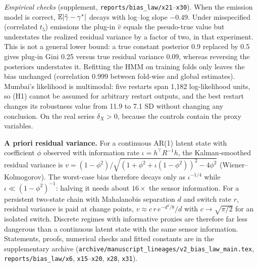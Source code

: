 \emph{Empirical checks} (supplement, \texttt{reports/bias\_law/x21}--\texttt{x30}). When the emission model is correct, $\mathbb{E}|\hat\gamma-\gamma^*|$ decays with log--log slope $-0.49$. Under misspecified (correlated $t_5$) emissions the plug-in $\hat v$ equals the pseudo-true value but understates the realized residual variance by a factor of two, in that experiment. This is not a general lower bound: a true constant posterior 0.9 replaced by 0.5 gives plug-in Gini 0.25 versus true residual variance 0.09, whereas reversing the posteriors understates it. Refitting the HMM on training folds only leaves the bias unchanged (correlation 0.999 between fold-wise and global estimates). Mumbai's likelihood is multimodal: five restarts span 1{,}182 log-likelihood units, so (H1) cannot be assumed for arbitrary restart outputs, and the best restart changes its robustness value from 11.9 to 7.1 SD without changing any conclusion. On the real series $\delta_X>0$, because the controls contain the proxy variables.

\textbf{A priori residual variance.} For a continuous AR(1) latent state with coefficient $\phi$ observed with information rate $\iota=h^\top R^{-1}h$, the Kalman-smoothed residual variance is $v=(1-\phi^2)/\sqrt{(1+\phi^2+\iota(1-\phi^2))^2-4\phi^2}$ (Wiener--Kolmogorov). The worst-case bias therefore decays only as $\iota^{-1/4}$ while $\iota\ll(1-\phi^2)^{-1}$: halving it needs about $16\times$ the sensor information. For a persistent two-state chain with Mahalanobis separation $d$ and switch rate $r$, residual variance is paid at change points, $v\approx c\,r\,e^{-d^2/8}/d$ with $c\to\sqrt{\pi/2}$ for an isolated switch. Discrete regimes with informative proxies are therefore far less dangerous than a continuous latent state with the same sensor information. Statements, proofs, numerical checks and fitted constants are in the supplementary archive (\texttt{archive/manuscript\_lineages/v2\_bias\_law\_main.tex}, \texttt{reports/bias\_law/x6}, \texttt{x15}--\texttt{x20}, \texttt{x28}, \texttt{x31}).

